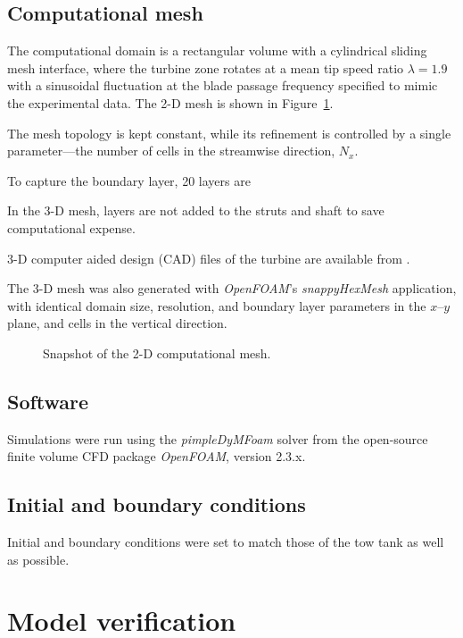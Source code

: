 \documentclass[aip,graphicx]{revtex4-1}
\begin{document}
\subsection{Computational mesh}

The computational domain is a rectangular volume
with a cylindrical sliding mesh interface, where the turbine zone rotates at a
mean tip speed ratio $\lambda=1.9$ with a sinusoidal fluctuation at the blade
passage frequency specified to mimic the experimental data. 
The 2-D mesh is
shown in Figure~\ref{fig:mesh}.

The mesh topology is kept constant, while its refinement is controlled by a
single parameter---the number of cells in the streamwise direction, $N_x$. 

To capture the boundary layer, 20 layers are

In the 3-D mesh, layers are not added to the struts and shaft to save
computational expense.

3-D computer aided design (CAD) files of the turbine are available from
\cite{Bachant2014-RVAT-CAD}.

The 3-D mesh was also generated with \textit{OpenFOAM}'s \textit{snappyHexMesh}
application, with identical domain size, resolution, and boundary layer
parameters in the $x$--$y$ plane, and 
cells in the vertical direction.

\begin{figure}[ht]
\caption{Snapshot of the 2-D computational mesh.}
\label{fig:mesh}
\end{figure}

\subsection{Software}

Simulations were run using the \textit{pimpleDyMFoam} solver from the
open-source finite volume CFD package \textit{OpenFOAM}, version 2.3.x.

\subsection{Initial and boundary conditions}

Initial and boundary conditions were set to match those of the tow tank as well
as possible. 

\section{Model verification}
\end{document}

